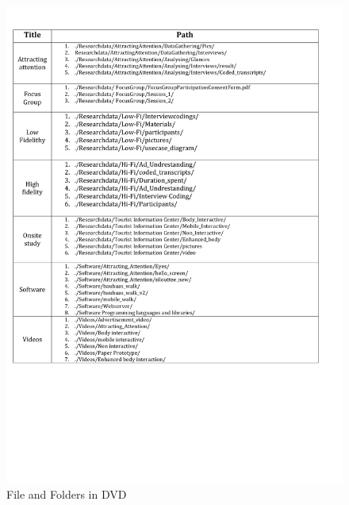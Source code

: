 \begin{appendices}
\begin{figure}[H]
 \centering 
    \includegraphics[width=\textwidth,height=0.6\textheight]{Appendices/files_and_folders.pdf}
    \caption{File and Folders in DVD}
     \label{app:fileandfolders}%
\end{figure}



\end{appendices}
